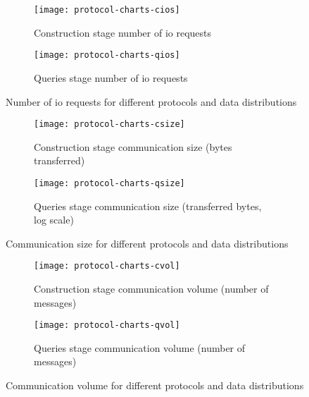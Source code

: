 \begin{figure*}[ht!]
	\captionsetup[subfigure]{justification=centering}
	\centering
	\begin{subfigure}[t]{0.5\textwidth}
		\centering
		\texttt{[image: protocol-charts-cios]}
		\caption{Construction stage number of \acrshort{io} requests}%
		\label{figure:protocols-ios:c}
	\end{subfigure}%
	\hfill
	\begin{subfigure}[t]{0.5\textwidth}
		\centering
		\texttt{[image: protocol-charts-qios]}
		\caption{Queries stage number of \acrshort{io} requests}%
		\label{figure:protocols-ios:q}
	\end{subfigure}%
	\caption{Number of \acrshort{io} requests for different protocols and data distributions}%
	\label{figure:protocols-ios}
\end{figure*}

\begin{figure*}[ht!]
	\captionsetup[subfigure]{justification=centering}
	\centering
	\begin{subfigure}[t]{0.5\textwidth}
		\centering
		\texttt{[image: protocol-charts-csize]}
		\caption{Construction stage communication size (bytes transferred)}%
		\label{figure:protocols-size:c}
	\end{subfigure}%
	\hfill
	\begin{subfigure}[t]{0.5\textwidth}
		\centering
		\texttt{[image: protocol-charts-qsize]}
		\caption{Queries stage communication size (transferred bytes, log scale)}%
		\label{figure:protocols-size:q}
	\end{subfigure}%
	\caption{Communication size for different protocols and data distributions}%
	\label{figure:protocols-size}
\end{figure*}

\begin{figure*}[ht!]
	\captionsetup[subfigure]{justification=centering}
	\centering
	\begin{subfigure}[t]{0.5\textwidth}
		\centering
		\texttt{[image: protocol-charts-cvol]}
		\caption{Construction stage communication volume (number of messages)}%
		\label{figure:protocols-vol:c}
	\end{subfigure}%
	\hfill
	\begin{subfigure}[t]{0.5\textwidth}
		\centering
		\texttt{[image: protocol-charts-qvol]}
		\caption{Queries stage communication volume (number of messages)}%
		\label{figure:protocols-vol:q}
	\end{subfigure}%
	\caption{Communication volume for different protocols and data distributions}%
	\label{figure:protocols-vol}
\end{figure*}
